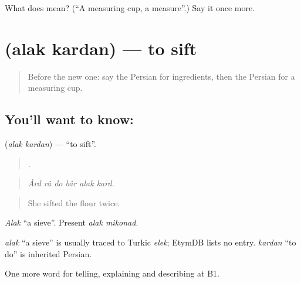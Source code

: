 \begin{tcolorbox}[breakable,colback=teal!4,colframe=teal!35!black,title={Before you move on}]
What does  mean? (\textquotedblleft{}A measuring cup, a measure\textquotedblright{}.) Say it once more.
\end{tcolorbox}
\section[\texorpdfstring{\fa{الک} \fa{کردن} (alak kardan)}{الک کردن (alak kardan)}]{  (alak kardan) — to sift}

\label{lesson:FA-C355-alak-kardan}



\begin{quote}
Before the new one: say the Persian for ingredients, then the Persian for a measuring cup.
\end{quote}

\subsection*{You'll want to know:  }
\textbf{ } (\emph{alak kardan}) — \textquotedblleft{}to sift\textquotedblright{}.

\begin{quote}
     .
\end{quote}

\begin{quote}
\emph{Ârd râ do bâr alak kard.}
\end{quote}

\begin{quote}
She sifted the flour twice.
\end{quote}

\emph{Alak} \textquotedblleft{}a sieve\textquotedblright{}. Present \emph{alak mikonad}.

\begin{cousinweb}
\emph{alak} \textquotedblleft{}a sieve\textquotedblright{} is usually traced to Turkic \emph{elek}; EtymDB lists no entry. \emph{kardan} \textquotedblleft{}to do\textquotedblright{} is inherited Persian.
\end{cousinweb}

\begin{grammarlens}[title={What you've built}]
One more word for telling, explaining and describing at B1.
\end{grammarlens}


